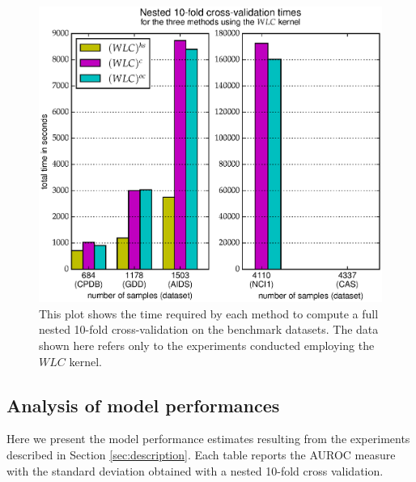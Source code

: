 \begin{figure}[ht]
    \centering
    \includegraphics[scale=0.7]{Figures/total_times1}
    \caption{
        This plot shows the time required by each method to compute a full nested 10-fold cross-validation on the benchmark datasets.
        The data shown here refers only to the experiments conducted employing the $WLC$ kernel.
    }
    \label{fig:datasetstimes1}
\end{figure}

\subsection{Analysis of model performances}

Here we present the model performance estimates resulting from the experiments described
in Section \ref{sec:description}.
Each table reports the AUROC measure with the standard deviation obtained with
a nested 10-fold cross validation.

